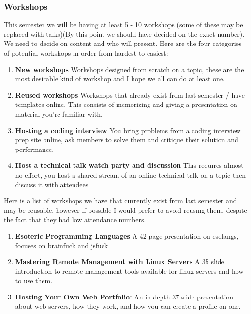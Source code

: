 \documentclass{article}
\begin{document}
\subsubsection{Workshops}
This semester we will be having at least 5 - 10 workshops (some of these may be replaced with talks)(By this point we should have decided on the exact number). We need to decide on content and who will present. Here are the four categories of potential workshops in order from hardest to easiest:
\begin{enumerate}
    \item \textbf{New workshops} Workshops designed from scratch on a topic, these are the most desirable kind of workshop and I hope we all can do at least one.
    \item \textbf{Reused workshops} Workshops that already exist from last semester / have templates online. This consists of memorizing and giving a presentation on material you're familiar with. 
    \item \textbf{Hosting a coding interview} You bring problems from a coding interview prep site online, ask members to solve them and critique their solution and performance.
    \item \textbf{Host a technical talk watch party and discussion} This requires almost no effort, you host a shared stream of an online technical talk on a topic then discuss it with attendees. 
\end{enumerate}
\vspace{2mm}\newline
Here is a list of workshops we have that currently exist from last semester and may be reusable, however if possible I would prefer to avoid reusing them, despite the fact that they had low attendance numbers. 
\begin{enumerate}
    \item \textbf{Esoteric Programming Languages} A 42 page presentation on esolangs, focuses on brainfuck and jsfuck
    \item \textbf{Mastering Remote Management with Linux Servers} A 35 slide introduction to remote management tools available for linux servers and how to use them. 
    \item \textbf{Hosting Your Own Web Portfolio:} An in depth 37 slide presentation about web servers, how they work, and how you can create a profile on one. 
\end{enumerate}

\newpage
\end{document}
